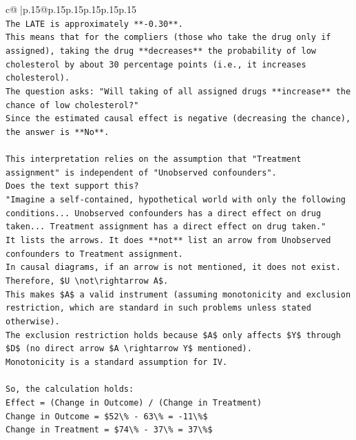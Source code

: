 \documentclass{article}
\begin{document}
{\begin{supertabular}{c@{$\;$}|p{.15\linewidth}@{}p{.15\linewidth}p{.15\linewidth}p{.15\linewidth}p{.15\linewidth}p{.15\linewidth}}
{{{\\ 
\texttt{The LATE is approximately **{-}0.30**.} \\
\texttt{This means that for the compliers (those who take the drug only if assigned), taking the drug **decreases** the probability of low cholesterol by about 30 percentage points (i.e., it increases cholesterol).} \\
\texttt{The question asks: "Will taking of all assigned drugs **increase** the chance of low cholesterol?"} \\
\texttt{Since the estimated causal effect is negative (decreasing the chance), the answer is **No**.} \\
\\ 
\texttt{This interpretation relies on the assumption that "Treatment assignment" is independent of "Unobserved confounders".} \\
\texttt{Does the text support this?} \\
\texttt{"Imagine a self{-}contained, hypothetical world with only the following conditions... Unobserved confounders has a direct effect on drug taken... Treatment assignment has a direct effect on drug taken."} \\
\texttt{It lists the arrows. It does **not** list an arrow from Unobserved confounders to Treatment assignment.} \\
\texttt{In causal diagrams, if an arrow is not mentioned, it does not exist.} \\
\texttt{Therefore, \$U \textbackslash{}not\textbackslash{}rightarrow A\$.} \\
\texttt{This makes \$A\$ a valid instrument (assuming monotonicity and exclusion restriction, which are standard in such problems unless stated otherwise).} \\
\texttt{The exclusion restriction holds because \$A\$ only affects \$Y\$ through \$D\$ (no direct arrow \$A \textbackslash{}rightarrow Y\$ mentioned).} \\
\texttt{Monotonicity is a standard assumption for IV.} \\
\\ 
\texttt{So, the calculation holds:} \\
\texttt{Effect = (Change in Outcome) / (Change in Treatment)} \\
\texttt{Change in Outcome = \$52\textbackslash{}\% {-} 63\textbackslash{}\% = {-}11\textbackslash{}\%\$} \\
\texttt{Change in Treatment = \$74\textbackslash{}\% {-} 37\textbackslash{}\% = 37\textbackslash{}\%\$} \\
}}}
\end{supertabular}}
\end{document}
